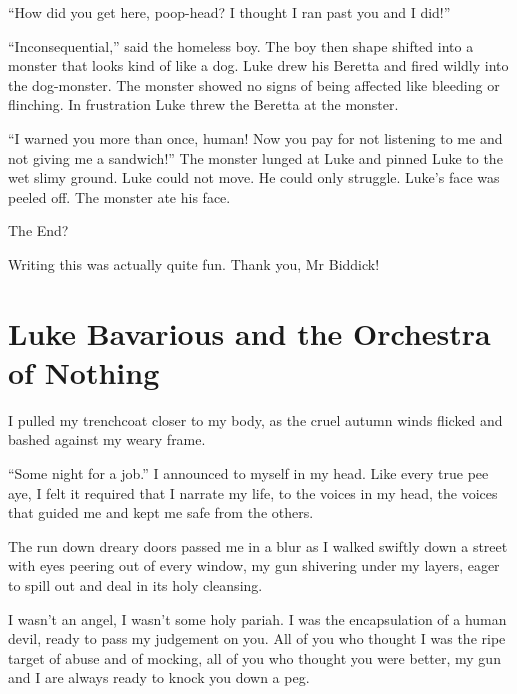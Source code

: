 ``How did you get here, poop-head? I thought I ran past you
and I did!''



``Inconsequential,'' said the homeless boy. The boy then
shape shifted into a monster that looks kind of like a dog. Luke
drew his Beretta and fired wildly into the dog-monster. The monster
showed no signs of being affected like bleeding or flinching. In
frustration Luke threw the Beretta at the monster.



``I warned you more than once, human! Now you pay for not
listening to me and not giving me a sandwich!'' The monster
lunged at Luke and pinned Luke to the wet slimy ground. Luke could
not move. He could only struggle. Luke's face was peeled off.
The monster ate his face.



The End?



Writing this was actually quite fun. Thank you, Mr Biddick! 

 



\chapter[The Orchestra of Nothing]{Luke Bavarious and the Orchestra of Nothing}



I pulled my trenchcoat closer to my body, as the cruel autumn winds
flicked and bashed against my weary frame.

``Some night for a job.'' I announced to myself in my
head. Like every true pee aye, I felt it required that I narrate my
life, to the voices in my head, the voices that guided me and kept
me safe from the others.

The run down dreary doors passed me in a blur as I walked swiftly
down a street with eyes peering out of every window, my gun
shivering under my layers, eager to spill out and deal in its holy
cleansing.



I wasn't an angel, I wasn't some holy pariah. I was the
encapsulation of a human devil, ready to pass my judgement on you.
All of you who thought I was the ripe target of abuse and of
mocking, all of you who thought you were better, my gun and I are
always ready to knock you down a peg.



